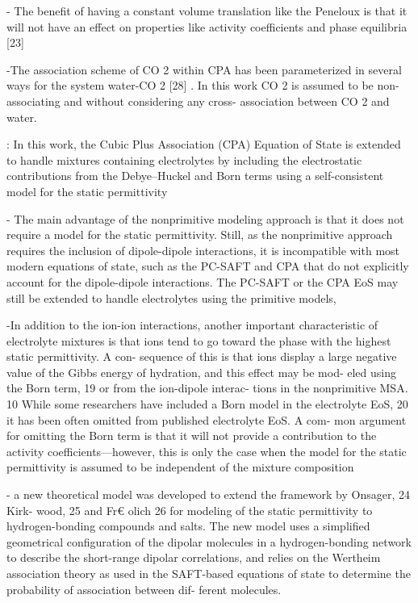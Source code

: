 - The beneﬁt of having a constant volume translation like
the Peneloux is that it will not have an effect on properties like
activity coeﬃcients and phase equilibria [23]

-The association scheme of CO 2 within CPA has been parameterized
in several ways for the system water-CO 2 [28] . In this work CO 2 is
assumed to be non-associating and without considering any cross-
association between CO 2 and water.


\cite{Maribo2015}:
In this work, the Cubic Plus Association (CPA) Equation of State is extended to handle mixtures containing electrolytes by including the electrostatic contributions from the Debye–Huckel and Born terms using a self-consistent model for the static permittivity

- The main advantage of the nonprimitive modeling
approach is that it does not require a model for the static
permittivity. Still, as the nonprimitive approach requires the
inclusion of dipole-dipole interactions, it is incompatible
with most modern equations of state, such as the PC-SAFT
and CPA that do not explicitly account for the dipole-dipole
interactions. The PC-SAFT or the CPA EoS may still be extended to handle electrolytes using the primitive models,

-In addition to the ion-ion interactions, another important
characteristic of electrolyte mixtures is that ions tend to go
toward the phase with the highest static permittivity. A con-
sequence of this is that ions display a large negative value of
the Gibbs energy of hydration, and this effect may be mod-
eled using the Born term, 19 or from the ion-dipole interac-
tions in the nonprimitive MSA. 10 While some researchers
have included a Born model in the electrolyte EoS, 20 it has
been often omitted from published electrolyte EoS. A com-
mon argument for omitting the Born term is that it will not
provide a contribution to the activity coefficients—however,
this is only the case when the model for the static permittivity is assumed to be independent of the mixture composition

- a new theoretical model
was developed to extend the framework by Onsager, 24 Kirk-
wood, 25 and Fr€ olich 26 for modeling of the static permittivity
to hydrogen-bonding compounds and salts. The new model
uses a simplified geometrical configuration of the dipolar
molecules in a hydrogen-bonding network to describe the
short-range dipolar correlations, and relies on the Wertheim
association theory as used in the SAFT-based equations of
state to determine the probability of association between dif-
ferent molecules.

